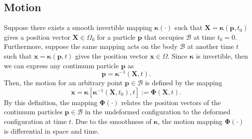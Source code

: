 \subsection{Motion}
\begin{definition}[Motion]
Suppose there exists a smooth invertible mapping $\boldsymbol{\kappa}(\cdot)$ such that $\boldsymbol{X} = \boldsymbol{\kappa}(\boldsymbol{p},t_0)$ gives a position vector $\boldsymbol{X} \in {\Omega}_0$ for a particle $\boldsymbol{p}$ that occupies $\mathcal{B}$ at time $t_0 = 0$. Furthermore, suppose the same mapping acts on the body $\mathcal{B}$  at another time $t$ such that $\boldsymbol{x} = \boldsymbol{\kappa}(\boldsymbol{p},t)$ gives the position vector $\boldsymbol{x} \in \Omega$. 
Since $\boldsymbol{\kappa}$ is invertible, then we can express any continuum particle $\boldsymbol{p}$ as 
\begin{equation}
\boldsymbol{p} = \boldsymbol{\kappa}^{-1}(\boldsymbol{X},t).
\end{equation}
Then, the motion for an arbitrary point $\boldsymbol{p} \in \mathcal{B}$ is defined by the mapping 
\begin{equation}
\boldsymbol{x} = \boldsymbol{\kappa}\left[ \boldsymbol{\kappa}^{-1}(\boldsymbol{X},t_0),t \right] := \boldsymbol{\Phi}(\boldsymbol{X},t).
\end{equation}
By this definition, the mapping $\boldsymbol{\Phi}(\cdot)$ relates the position vectors of the continuum particles $\boldsymbol{p} \in \mathcal{B}$ in the undeformed configuration to the deformed configuration at time $t$. Due to the smoothness of $\boldsymbol{\kappa}$, the motion mapping $\boldsymbol{\Phi}(\cdot)$ is differential in space and time.
\end{definition}

\noindent 
